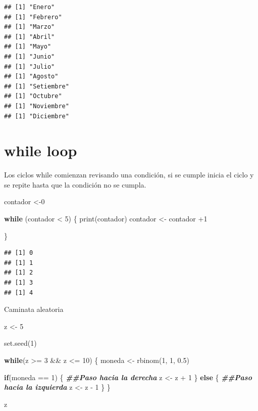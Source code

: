 \documentclass[
  12pt,
]{book}
\newenvironment{Shaded}{\begin{snugshade}}{\end{snugshade}}
\newcommand{\ControlFlowTok}[1]{\textcolor[rgb]{0.13,0.29,0.53}{\textbf{#1}}}
\newcommand{\DecValTok}[1]{\textcolor[rgb]{0.00,0.00,0.81}{#1}}
\newcommand{\DocumentationTok}[1]{\textcolor[rgb]{0.56,0.35,0.01}{\textbf{\textit{#1}}}}
\newcommand{\FloatTok}[1]{\textcolor[rgb]{0.00,0.00,0.81}{#1}}
\newcommand{\FunctionTok}[1]{\textcolor[rgb]{0.00,0.00,0.00}{#1}}
\newcommand{\NormalTok}[1]{#1}
\newcommand{\OtherTok}[1]{\textcolor[rgb]{0.56,0.35,0.01}{#1}}
\newcommand{\SpecialCharTok}[1]{\textcolor[rgb]{0.00,0.00,0.00}{#1}}
\begin{document}
\begin{verbatim}
## [1] "Enero"
## [1] "Febrero"
## [1] "Marzo"
## [1] "Abril"
## [1] "Mayo"
## [1] "Junio"
## [1] "Julio"
## [1] "Agosto"
## [1] "Setiembre"
## [1] "Octubre"
## [1] "Noviembre"
## [1] "Diciembre"
\end{verbatim}

\hypertarget{while-loop}{%
\section{\texorpdfstring{\textbf{while loop}}{while loop}}\label{while-loop}}

Los ciclos while comienzan revisando una condición, si se cumple inicia el ciclo y se repite hasta que la condición no se cumpla.

\begin{Shaded}
\begin{Highlighting}[]
\NormalTok{contador }\OtherTok{\textless{}{-}}\DecValTok{0}

\ControlFlowTok{while}\NormalTok{ (contador }\SpecialCharTok{\textless{}} \DecValTok{5}\NormalTok{) \{}
  \FunctionTok{print}\NormalTok{(contador)}
\NormalTok{  contador }\OtherTok{\textless{}{-}}\NormalTok{ contador }\SpecialCharTok{+}\DecValTok{1}
  
\NormalTok{\}}
\end{Highlighting}
\end{Shaded}

\begin{verbatim}
## [1] 0
## [1] 1
## [1] 2
## [1] 3
## [1] 4
\end{verbatim}

Caminata aleatoria

\begin{Shaded}
\begin{Highlighting}[]
\NormalTok{z }\OtherTok{\textless{}{-}} \DecValTok{5}

\FunctionTok{set.seed}\NormalTok{(}\DecValTok{1}\NormalTok{)}

\ControlFlowTok{while}\NormalTok{(z }\SpecialCharTok{\textgreater{}=} \DecValTok{3} \SpecialCharTok{\&\&}\NormalTok{ z }\SpecialCharTok{\textless{}=} \DecValTok{10}\NormalTok{) \{}
\NormalTok{  moneda }\OtherTok{\textless{}{-}} \FunctionTok{rbinom}\NormalTok{(}\DecValTok{1}\NormalTok{, }\DecValTok{1}\NormalTok{, }\FloatTok{0.5}\NormalTok{) }
  
  \ControlFlowTok{if}\NormalTok{(moneda }\SpecialCharTok{==} \DecValTok{1}\NormalTok{) \{ }\DocumentationTok{\#\#Paso hacia la derecha}
\NormalTok{    z }\OtherTok{\textless{}{-}}\NormalTok{ z }\SpecialCharTok{+} \DecValTok{1}
\NormalTok{  \} }\ControlFlowTok{else}\NormalTok{ \{          }\DocumentationTok{\#\#Paso hacia la izquierda}
\NormalTok{    z }\OtherTok{\textless{}{-}}\NormalTok{ z }\SpecialCharTok{{-}} \DecValTok{1}
\NormalTok{  \}}
\NormalTok{\}}

\NormalTok{z}
\end{Highlighting}
\end{Shaded}
\end{document}
